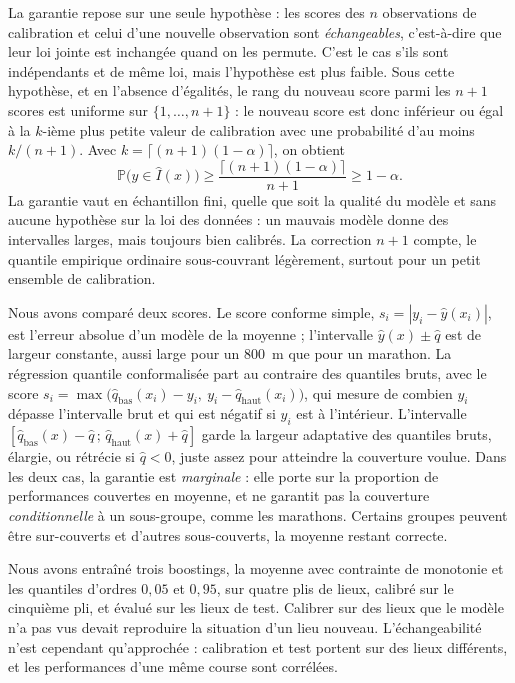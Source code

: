 \documentclass[11pt,a4paper]{article}
\begin{document}
La garantie repose sur une seule hypothèse : les scores des $n$ observations de calibration et celui d'une nouvelle
observation sont \emph{échangeables}, c'est-à-dire que leur loi jointe est inchangée quand on les permute. C'est le cas
s'ils sont indépendants et de même loi, mais l'hypothèse est plus faible. Sous cette hypothèse, et en l'absence
d'égalités, le rang du nouveau score parmi les $n + 1$ scores est uniforme sur $\{1, \dots, n + 1\}$ : le nouveau
score est donc inférieur ou égal à la $k$-ième plus petite valeur de calibration avec une probabilité d'au moins
$k/(n + 1)$. Avec $k = \lceil (n+1)(1-\alpha)\rceil$, on obtient
\begin{equation}\label{eq:garantie_conforme}
\mathbb{P}\big(y \in \hat I(x)\big) \geq \frac{\lceil (n+1)(1-\alpha)\rceil}{n + 1} \geq 1 - \alpha .
\end{equation}
La garantie vaut en échantillon fini, quelle que soit la qualité du modèle et sans aucune hypothèse sur la loi des
données : un mauvais modèle donne des intervalles larges, mais toujours bien calibrés. La correction $n + 1$ compte, le
quantile empirique ordinaire sous-couvrant légèrement, surtout pour un petit ensemble de calibration.

Nous avons comparé deux scores. Le score conforme simple, $s_i = |y_i - \hat y(x_i)|$, est l'erreur absolue d'un
modèle de la moyenne ; l'intervalle $\hat y(x) \pm \hat q$ est de largeur constante, aussi large pour un 800~m que
pour un marathon. La régression quantile conformalisée \citep[CQR,][]{romano2019} part au contraire des quantiles
bruts, avec le score $s_i = \max\big(\hat q_{\text{bas}}(x_i) - y_i,\ y_i - \hat q_{\text{haut}}(x_i)\big)$, qui mesure
de combien $y_i$ dépasse l'intervalle brut et qui est négatif si $y_i$ est à l'intérieur. L'intervalle
$[\hat q_{\text{bas}}(x) - \hat q\,;\,\hat q_{\text{haut}}(x) + \hat q]$ garde la largeur adaptative des quantiles
bruts, élargie, ou rétrécie si $\hat q < 0$, juste assez pour atteindre la couverture voulue. Dans les deux cas, la
garantie est \emph{marginale} : elle porte sur la proportion de performances couvertes en moyenne, et ne garantit pas
la couverture \emph{conditionnelle} à un sous-groupe, comme les marathons. Certains groupes peuvent être sur-couverts et
d'autres sous-couverts, la moyenne restant correcte.

Nous avons entraîné trois boostings, la moyenne avec contrainte de monotonie et les quantiles d'ordres $0{,}05$ et
$0{,}95$, sur quatre plis de lieux, calibré sur le cinquième pli, et évalué sur les lieux de test. Calibrer sur des
lieux que le modèle n'a pas vus devait reproduire la situation d'un lieu nouveau. L'échangeabilité n'est cependant
qu'approchée : calibration et test portent sur des lieux différents, et les performances d'une même course sont
corrélées.
\end{document}
